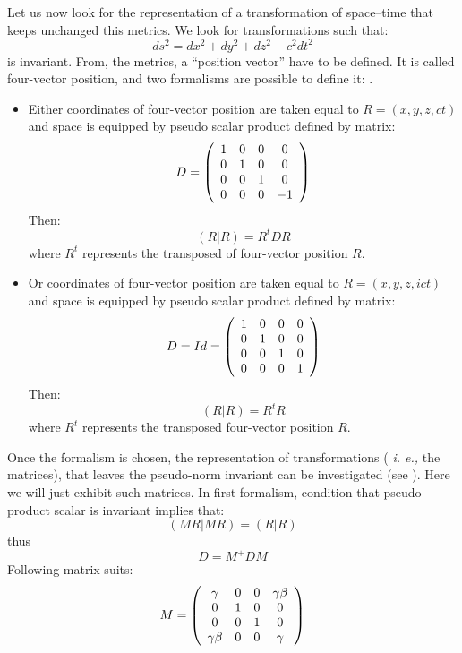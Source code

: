 \documentclass[12pt]{book}
\begin{document}
Let us now look for the representation of a transformation of space--time that
keeps unchanged this metrics. We look for transformations such 
that:
\begin{equation}
ds^2=dx^2+dy^2+dz^2-c^2dt^2
\end{equation}
is invariant.
From, the metrics, a ``position vector'' have to be defined. It is called
four-vector position, and two formalisms are possible to define it:
.
\begin{itemize}
\item Either coordinates of four-vector position are taken equal to
$R=(x,y,z,ct)$ and space is equipped by pseudo scalar product defined by matrix:
\begin{equation}
D=
\left( \begin{array}{cccc}
1&0&0&0 \cr
0&1&0&0\cr
0&0&1&0\cr
0&0&0&-1\cr
\end{array} \right)
\end{equation}
Then:
\begin{equation}
(R|R)=R^tDR
\end{equation}
where $R^t$ represents the transposed of four-vector position $R$.
\item Or  coordinates of four-vector position are taken equal to
$R=(x,y,z,ict)$ and space is equipped by pseudo scalar product defined by
matrix: 
\begin{equation}
D=Id=
\left( \begin{array}{cccc}
1&0&0&0 \cr
0&1&0&0\cr
0&0&1&0\cr
0&0&0&1\cr
    \end{array} \right)      
\end{equation}
Then:
\begin{equation}
(R|R)=R^tR
\end{equation}
where $R^t$ represents the transposed four-vector position $R$.
\end{itemize}
Once the formalism is chosen, the representation of transformations ({\it
  i. e.,} the matrices), that leaves the pseudo-norm invariant can be
  investigated 
(see \cite{ph:relat:Misner73g}). Here we will just exhibit such matrices. In
first formalism, condition that pseudo-product scalar is invariant implies
that:
\begin{equation}
(MR|MR)=(R|R)
\end{equation}
thus
\begin{equation}
D=M^+DM
\label{cond}
\end{equation}
Following matrix suits:
\begin{equation}
M=
\left( \begin{array}{cccc}
\gamma&0&0&\gamma \beta \cr
0&1&0&0\cr
0&0&1&0\cr
\gamma \beta&0&0&\gamma\cr
         \end{array} \right)
\end{equation}
\end{document}
